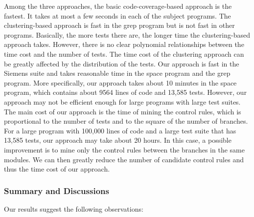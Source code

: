 \documentclass{sig-alternate}
\begin{document}
Among the three approaches, the basic code-coverage-based approach
is the fastest. It takes at most a few seconds in each of the
subject programs. The clustering-based approach is fast in the grep
program but is not fast in other programs. Basically, the more tests
there are, the longer time the clustering-based approach takes.
However, there is no clear polynomial relationships between the time
cost and the number of tests. The time cost of the clustering
approach can be greatly affected by the distribution of the tests.
Our approach is fast in the Siemens suite and takes reasonable time
in the space program and the grep program. More specifically, our
approach takes about 10 minutes in the space program, which contains
about 9564 lines of code and 13,585 tests. However, our approach may
not be efficient enough for large programs with large test suites.
The main cost of our approach is the time of mining the control
rules, which is proportional to the number of tests and to the
square of the number of branches. For a large program with 100,000
lines of code and a large test suite that has 13,585 tests, our
approach may take about 20 hours. In this case, a possible
improvement is to mine only the control rules between the branches
in the same modules. We can then greatly reduce the number of
candidate control rules and thus the time cost of our approach.

\vspace{-0.1in}
\subsubsection{Summary and Discussions}

Our results suggest the following observations:
\end{document}
